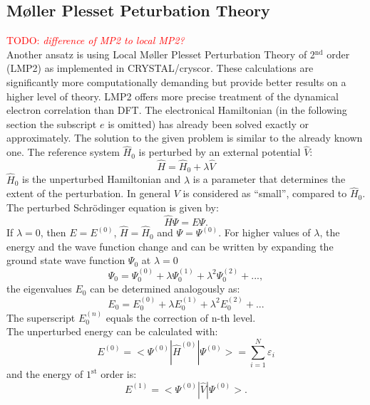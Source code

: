\documentclass[11pt,DIV=13,BCOR=5mm,a4paper,headinclude]{scrbook}
\newcommand\todo[1]{\textcolor{red}{TODO: \textit{{#1}}}}
\begin{document}
\subsection{M\o{}ller Plesset Peturbation Theory}
\todo{difference of MP2 to local MP2?}\\
Another ansatz is using Local M\o{}ller Plesset Perturbation Theory\cite{mollerplesset,usvyat2015,usvyatbook} of 2$^{\textrm{nd}}$ order (LMP2) as implemented in CRYSTAL/cryscor\cite{crystal14,cryscor}.
These calculations are significantly more computationally demanding but provide better results on a higher level of theory.
LMP2 offers more precise treatment of the dynamical electron correlation than DFT.
The electronical Hamiltonian (in the following section the subscript $e$ is omitted) has already been solved exactly or approximately.
The solution to the given problem is similar to the already known one.
The reference system $\hat{H}_0$ is perturbed by an external potential $\hat{V}$:
\begin{equation}
 \hat{H} = \hat{H}_0 + \lambda \hat{V}
\end{equation}
$\hat{H}_0$ is the unperturbed Hamiltonian and $\lambda$ is a parameter that determines the extent of the perturbation.
In general $V$ is considered as ``small'', compared to $\hat{H}_0$.
The perturbed Schrödinger equation is given by:
\begin{equation}
 \hat{H}\Psi = E\Psi.
\end{equation}
If $\lambda=0$, then $E=E^{(0)}$, $\hat{H} = \hat{H}_0$ and $\Psi=\Psi^{(0)}$.
For higher values of $\lambda$, the energy and the wave function change and can be written by expanding the ground state wave function $\Psi_0$ at $\lambda=0$
\begin{equation}
 \Psi_0 = \Psi_0^{(0)} + \lambda \Psi_0^{(1)} + \lambda^2\Psi_0^{(2)} + ...,
\end{equation}
the eigenvalues $E_0$ can be determined analogously as:
\begin{equation}
 E_0 = E_0^{(0)} + \lambda E_0^{(1)} + \lambda^2E_0^{(2)} + ...
\end{equation}
The superscript $E_0^{(n)}$ equals the correction of n-th level.\\
The unperturbed energy can be calculated with:
\begin{equation}
 E^{(0)} = <\Psi^{(0)}|\hat{H}^{(0)}|\Psi^{(0)}>=\sum\limits_{i=1}^N\varepsilon_i
\end{equation}
and the energy of $1^\textrm{st}$ order is:
\begin{equation}
 E^{(1)} = <\Psi^{(0)}|\hat{V}|\Psi^{(0)}>.
\end{equation}
\end{document}
